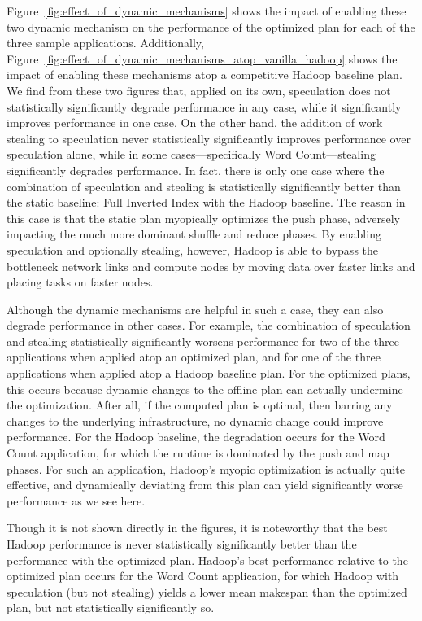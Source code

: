 Figure~\ref{fig:effect_of_dynamic_mechanisms} shows the impact of enabling
these two dynamic mechanism on the performance of the optimized plan for each
of the three sample applications.
Additionally, Figure~\ref{fig:effect_of_dynamic_mechanisms_atop_vanilla_hadoop}
shows the impact of enabling these mechanisms atop a competitive Hadoop
baseline plan.
We find from these two figures that, applied on its own, speculation does not
statistically significantly degrade performance in any case, while it
significantly improves performance in one case.
On the other hand, the addition of work stealing to speculation never
statistically significantly improves performance over speculation alone,
while in some cases---specifically Word Count---stealing significantly
degrades performance.
In fact, there is only one case where the combination of speculation and
stealing is statistically significantly better than the static baseline: Full
Inverted Index with the Hadoop baseline.
The reason in this case is that the static plan myopically optimizes the push
phase, adversely impacting the much more dominant shuffle and reduce phases.
By enabling speculation and optionally stealing, however, Hadoop is able to
bypass the bottleneck network links and compute nodes by moving data over
faster links and placing tasks on faster nodes.

Although the dynamic mechanisms are helpful in such a case, they can also
degrade performance in other cases.
For example, the combination of speculation and stealing statistically
significantly worsens performance for two of the three applications when
applied atop an optimized plan, and for one of the three applications when
applied atop a Hadoop baseline plan.
For the optimized plans, this occurs because dynamic changes to the offline plan
can actually undermine the optimization.
After all, if the computed plan is optimal, then barring any changes to the
underlying infrastructure, no dynamic change could improve performance.
For the Hadoop baseline, the degradation occurs for the Word Count application,
for which the runtime is dominated by the push and map phases.
For such an application, Hadoop's myopic optimization is actually quite
effective, and dynamically deviating from this plan can yield significantly
worse performance as we see here.

Though it is not shown directly in the figures, it is noteworthy that the best
Hadoop performance is never statistically significantly better than the
performance with the optimized plan.
Hadoop's best performance relative to the optimized plan occurs for the Word
Count application, for which Hadoop with speculation (but not stealing) yields
a lower mean makespan than the optimized plan, but not statistically
significantly so.

